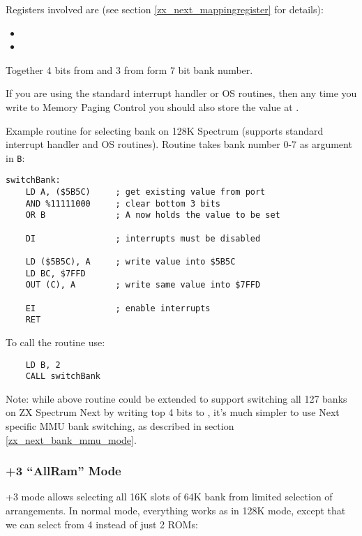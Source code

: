Registers involved are (see section \ref{zx_next_mappingregister} for details):

\begin{itemize}[topsep=1pt,itemsep=1pt]
    \item {}
    \item {}
\end{itemize}

Together 4 bits from  and 3 from  form 7 bit bank number.

If you are using the standard interrupt handler or OS routines, then any time you write to Memory Paging Control  you should also store the value at .

Example routine for selecting bank on 128K Spectrum (supports standard interrupt handler and OS routines). Routine takes bank number 0-7 as argument in {\tt B}:

\begin{lstlisting}
switchBank:
    LD A, ($5B5C)     ; get existing value from port
    AND %11111000     ; clear bottom 3 bits
    OR B              ; A now holds the value to be set

    DI                ; interrupts must be disabled

    LD ($5B5C), A     ; write value into $5B5C
    LD BC, $7FFD
    OUT (C), A        ; write same value into $7FFD

    EI                ; enable interrupts
    RET
\end{lstlisting}

To call the routine use:

\begin{lstlisting}
    LD B, 2
    CALL switchBank
\end{lstlisting}

Note: while above routine could be extended to support switching all 127 banks on ZX Spectrum Next by writing top 4 bits to , it's much simpler to use Next specific MMU bank switching, as described in section \ref{zx_next_bank_mmu_mode}.

\pagebreak
\subsubsection{+3 ``AllRam'' Mode}

+3 mode allows selecting all 16K slots of 64K bank from limited selection of arrangements. In normal mode, everything works as in 128K mode, except that we can select from 4 instead of just 2 ROMs:

